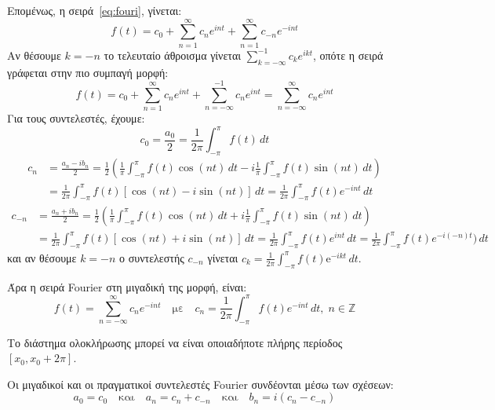 \documentclass[a4paper,table]{report}
\begin{document}
Επομένως, η σειρά~\eqref{eq:fouri}, γίνεται:
\[
  f(t) = c_{0} + \sum_{n=1}^{\infty} c_{n} e^{int} + \sum_{n=1}^{\infty} c_{-n}
  e^{-int} 
\] 
Αν θέσουμε $ k=-n $ το τελευταίο άθροισμα γίνεται $ \sum_{k=-\infty}^{-1} c_{k}
e^{ikt} $, οπότε η σειρά γράφεται στην πιο συμπαγή μορφή:
\[
  f(t) = c_{0} + \sum_{n=1}^{\infty} c_{n} e^{int} + \sum_{n=-\infty}^{-1} c_{n}
  e^{int} = \sum_{n=- \infty}^{\infty} c_{n} e^{int}
\]
Για τους συντελεστές, έχουμε:
\[
  c_{0} = \frac{a_{0}}{2} = \frac{1}{2\pi} \int _{- \pi }^{\pi} f(t) \,{dt}
\] 
\begin{align*}
  c_{n} &= \frac{a_{n}-ib_{n}}{2} = \frac{1}{2} 
  \left(\frac{1}{\pi} \int _{- \pi }^{\pi } f(t) \cos{(nt)} \,{dt} - i
  \frac{1}{\pi} \int _{- \pi }^{\pi } f(t) \sin{(nt)} \,{dt}  \right) \\ 
        &= \frac{1}{2 \pi} \int _{- \pi }^{\pi} f(t) [\cos{(nt)} - i \sin{(nt)}] 
        \,{dt} = \frac{1}{2 \pi} \int _{- \pi }^{\pi } f(t) e^{-int} \,{dt}
\end{align*} 
\begin{align*}
  c_{-n} &= \frac{a_{n}+ib_{n}}{2} = \frac{1}{2} 
  \left(\frac{1}{\pi} \int _{- \pi }^{\pi } f(t) \cos{(nt)} \,{dt} + i
  \frac{1}{\pi} \int _{- \pi }^{\pi } f(t) \sin{(nt)} \,{dt}  \right) \\ 
         &= \frac{1}{2 \pi} \int _{- \pi }^{\pi} f(t) [\cos{(nt)} + i \sin{(nt)}] 
         \,{dt} = \frac{1}{2 \pi} \int _{- \pi }^{\pi } f(t) e^{int} \,{dt} = 
         \frac{1}{2 \pi} \int _{- \pi }^{\pi } f(t) e^{-i(-n)t}) \,{dt} 
\end{align*}
και αν θέσουμε $ k=-n $ ο συντελεστής $ c_{-n} $ γίνεται $ c_{k} =
\frac{1}{2 \pi} \int _{- \pi }^{\pi} f(t) \mathrm{e}^{-ikt}\,{dt} $.

Άρα η σειρά \textlatin{Fourier} στη μιγαδική της μορφή, είναι:
\[
  \boxed{f(t) = \sum_{n=- \infty}^{\infty} c_{n} e^{-int} \quad \text{με} \quad c_{n} =
  \frac{1}{2 \pi} \int _{- \pi}^{\pi } f(t) e^{-int} \,{dt}, \; n \in \mathbb{Z}}
\]

\begin{rem}
  Το διάστημα ολοκλήρωσης μπορεί να είναι οποιαδήποτε πλήρης περίοδος $ [x_{0},
  x_{0}+ 2 \pi] $. 
\end{rem}

\begin{rem}
  Οι μιγαδικοί και οι πραγματικοί συντελεστές \textlatin{Fourier} συνδέονται μέσω των 
  σχέσεων:
  \begin{equation}\label{eq:complex_coef}
    a_{0}= c_{0} \quad \text{και} \quad a_{n}= c_{n}+c_{-n} \quad \text{και} \quad 
    b_{n} = i(c_{n}-c_{-n})
  \end{equation} 
\end{rem}
\end{document}
